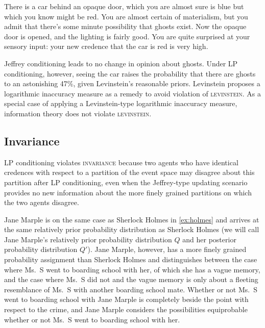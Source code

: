 \documentclass[phd,12pt,oneside]{ubcthesis}
\begin{document}
\begin{quotex}
  \label{ex:levinstein} There is a car
  behind an opaque door, which you are almost sure is blue but which
  you know might be red. You are almost certain of materialism, but
  you admit that there's some minute possibility that ghosts exist.
  Now the opaque door is opened, and the lighting is fairly good. You
  are quite surprised at your sensory input: your new credence that
  the car is red is very high.
\end{quotex}

Jeffrey conditioning leads to no change in opinion about ghosts. Under
LP conditioning, however, seeing the car raises the probability that
there are ghosts to an astonishing 47\%, given Levinstein's reasonable
priors. Levinstein proposes a logarithmic inaccuracy measure as a
remedy to avoid violation of \textsc{levinstein}. As a special case of
applying a Levinstein-type logarithmic inaccuracy measure, information
theory does not violate \textsc{levinstein}.

\subsection{Invariance}
\label{subsec:afaisiug}

LP conditioning violates \textsc{invariance} because two agents who
have identical credences with respect to a partition of the event
space may disagree about this partition after LP conditioning, even
when the Jeffrey-type updating scenario provides no new information
about the more finely grained partitions on which the two agents
disagree. 

\begin{quotex}
  \label{ex:marple} Jane Marple is on the same
  case as Sherlock Holmes in {\xample} \ref{ex:holmes} and arrives at
  the same relatively prior probability distribution as Sherlock
  Holmes (we will call Jane Marple's relatively prior probability
  distribution $Q$ and her posterior probability distribution $Q'$).
  Jane Marple, however, has a more finely grained probability
  assignment than Sherlock Holmes and distinguishes between the case
  where Ms.\ S went to boarding school with her, of which she has a
  vague memory, and the case where Ms.\ S did not and the vague memory
  is only about a fleeting resemblance of Ms.\ S with another boarding
  school mate. Whether or not Ms.\ S went to boarding school with Jane
  Marple is completely beside the point with respect to the crime, and
  Jane Marple considers the possibilities equiprobable whether or not
  Ms.\ S went to boarding school with her.
\end{quotex}
\end{document}
